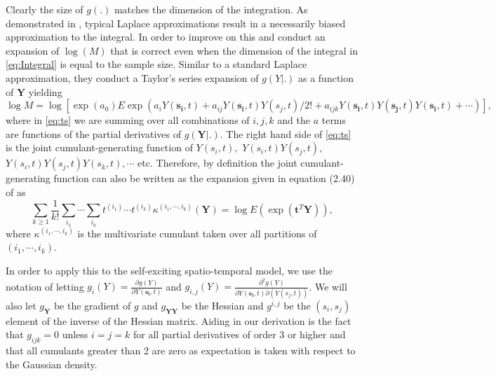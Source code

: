 \documentclass[11pt]{isuthesis}
\begin{document}
	Clearly the size of $g(.)$ matches the dimension of the integration.  As demonstrated in \cite{shun1995laplace}, typical Laplace approximations result in a necessarily biased approximation to the integral. In order to improve on this \cite{shun1995laplace} and \cite{evangelou2011estimation} conduct an expansion of $\log (M)$ that is correct even when the dimension of the integral in \eqref{eq:Integral} is equal to the sample size.  Similar to a standard Laplace approximation, they conduct a Taylor's series expansion of $g(Y|.)$ as a function of $\boldsymbol{Y}$ yielding
	\begin{equation}
	\log M = \log \left[\exp(a_0)E\exp\left(a_i Y(\boldsymbol{s_i},t)+a_{ij}Y(\boldsymbol{s_i},t)Y(s_j,t)/2!+a_{ijk}Y(\boldsymbol{s_i},t)Y(\boldsymbol{s_j},t)Y(\boldsymbol{s_i},t)+\cdots\right)\right]\label{eq:ts},
	\end{equation}
	where in \eqref{eq:ts} we are summing over all combinations of $i,j,k$ and the $a$ terms are functions of the partial derivatives of $g(\boldsymbol{Y}|.)$. The right hand side of \eqref{eq:ts} is the joint cumulant-generating function of $Y(s_i,t),$ $Y(s_i,t)Y(s_j,t),$  $Y(s_i,t)Y(s_j,t)Y(s_k,t),\cdots$ etc.  Therefore, by definition the joint cumulant-generating function can also be written as the expansion given in equation (2.40) of \cite{hall1992bootstrap} as
	\begin{equation}
	\sum_{k \geq 1}\frac{1}{k!}\sum_{i_1}\cdots\sum_{i_k} t^{(i_1)}\cdots t^{(i_k)} \kappa^{(i_1,\cdots,i_k)}(\boldsymbol{Y})=\log E\left(\exp(\boldsymbol{t}^T\boldsymbol{Y})\right),\label{eq:Hall}
	\end{equation}
	where $\kappa^{(i_1,\cdots,i_k)}$ is the multivariate cumulant taken over all partitions of $(i_1,\cdots,i_k)$.
	
	In order to apply this to the self-exciting spatio-temporal model, we use the notation of \cite{evangelou2011estimation} letting $g_i(Y)= \frac{\partial g(Y)}{\partial Y(\boldsymbol{s_i},t)}$ and $g_{i,j}(Y)=\frac{\partial^2 g(Y)}{\partial Y(\boldsymbol{s_i},t) \partial(Y(s_j,t))}$.  We will also let $g_{\boldsymbol{Y}}$ be the gradient of $g$ and $g_{\boldsymbol{YY}}$ be the Hessian and $g^{i,j}$ be the $(s_i,s_j)$ element of the inverse of the Hessian matrix.  Aiding in our derivation is the fact that $g_{ijk}=0$ unless $i=j=k$ for all partial derivatives of order 3 or higher and that all cumulants greater than 2 are zero as expectation is taken with respect to the Gaussian density.
	
\end{document}
